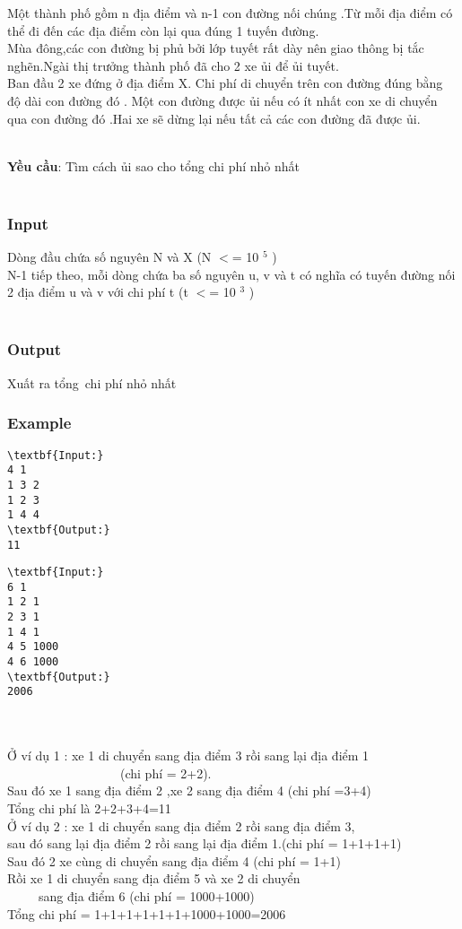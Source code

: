 

Một thành phố gồm n địa điểm và n-1 con đường nối chúng .Từ mỗi địa điểm có thể đi đến các địa điểm còn lại qua đúng 1 tuyến đường.
\\Mùa đông,các con đường bị phủ bởi lớp tuyết rất dày nên giao thông bị tắc nghẽn.Ngài thị trưởng thành phố đã cho 2 xe ủi để ủi tuyết.
\\Ban đầu 2 xe đứng ở địa điểm X. Chi phí di chuyển trên con đường đúng bằng độ dài con đường đó . Một con đường được ủi nếu có ít nhất con xe di chuyển qua con đường đó .Hai xe sẽ dừng lại nếu tất cả các con đường đã được ủi.


\\\textbf{Yều cầu}: Tìm cách ủi sao cho tổng chi phí nhỏ nhất
\\ 

\subsubsection{Input}

Dòng đầu chứa số nguyên N và X (N $<$= 10 $^ 5 $ )
\\N-1 tiếp theo, mỗi dòng chứa ba số nguyên u, v và t có nghĩa có tuyến đường nối 2 địa điểm u và v với chi phí t (t $<$= 10 $^ 3 $ )
\\ 

\subsubsection{Output}

Xuất ra tổng chi phí nhỏ nhất

\subsubsection{Example}
\begin{verbatim}
\textbf{Input:} 
4 1
1 3 2
1 2 3
1 4 4
\textbf{Output:}
11
\end{verbatim}
\begin{verbatim}
\textbf{Input:} 
6 1
1 2 1
2 3 1
1 4 1
4 5 1000
4 6 1000
\textbf{Output:}
2006\end{verbatim}


\\
\\Ở ví dụ 1 : xe 1 di chuyển sang địa điểm 3 rồi sang lại địa điểm 1
\\                  (chi phí = 2+2).
\\Sau đó xe 1 sang địa điểm 2 ,xe 2 sang địa điểm 4 (chi phí =3+4)
\\Tổng chi phí là 2+2+3+4=11
\\Ở ví dụ 2 : xe 1 di chuyển sang địa điểm 2 rồi sang địa điểm 3,
\\sau đó sang lại địa điểm 2 rồi sang lại địa điểm 1.(chi phí = 1+1+1+1)
\\Sau đó 2 xe cùng di chuyển sang địa điểm 4 (chi phí = 1+1)
\\Rồi xe 1 di chuyển sang địa điểm 5 và xe 2 di chuyển
\\     sang địa điểm 6 (chi phí = 1000+1000)
\\Tổng chi phí = 1+1+1+1+1+1+1000+1000=2006
\\
\\ 

 